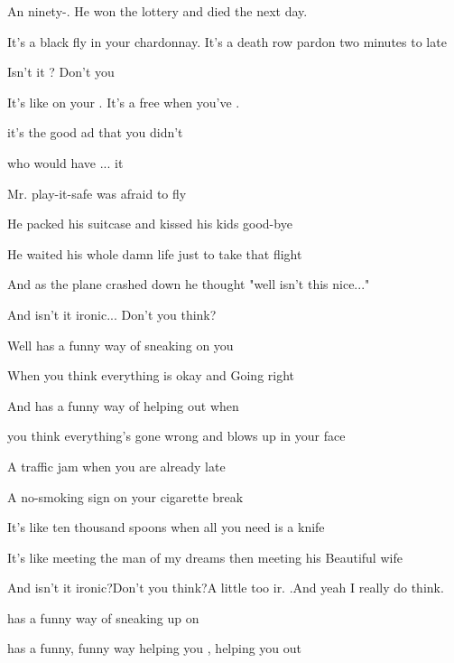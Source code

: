 

\zs
An    ninety-.
He won the lottery and died the next day.

It's a black fly in your chardonnay.
It's a death row pardon two minutes to late

Isn't it ? Don't you  
\ks

\zr
It's like  on your  .
It's a free  when you've  .

it's the good ad that you  didn't 

 who would have ... it 
\kr

\zs
Mr. play-it-safe was afraid to fly

He packed his suitcase and kissed his kids good-bye

He waited his whole damn life just to take that flight

And as the plane crashed down he thought "well isn't this nice..."

And isn't it ironic... Don't you think?
\ks

\zr  \kr

\zs
Well  has a funny way of sneaking  on you

When you think everything is okay and  Going right

And  has a funny way of helping  out when

you think everything's gone wrong and  blows up in your face
\ks

\zs
A traffic jam when you are already late

A no-smoking sign on your cigarette break

It's like ten thousand spoons when all you need is a knife

It's like meeting the man of my dreams then meeting his Beautiful wife

And isn't it ironic?Don't you think?A little too ir. .And yeah I really do think.
\ks

\zr  \kr

\zs
{} has a funny way of sneaking up on 

 has a funny, funny way  helping you , helping you out
\ks

\kp






















